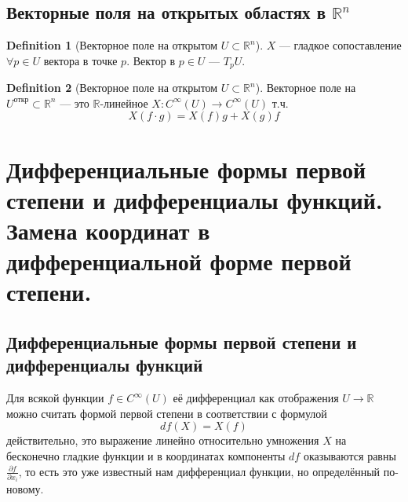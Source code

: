 \documentclass[a4paper,12pt]{article} %
\theoremstyle{definition}
\newtheorem{definition}{Definition}[section]
\begin{document}
\subsection{Векторные поля на открытых областях в $\mathbb{R}^n$}
\begin{definition}[Векторное поле на открытом $U \subset \mathbb{R}^n$]
	$X$ --- гладкое сопоставление $\forall p \in U$ вектора в точке $p$. Вектор в $p \in U$ --- $T_p U$.
\end{definition}
\begin{definition}[Векторное поле на открытом $U \subset \mathbb{R}^n$]
	Векторное поле на $U^{откр} \subset \mathbb{R}^n$ --- это $\mathbb{R}$-линейное $X: C^{\infty} (U) \rightarrow C^{\infty} (U)$ т.ч. 
	\begin{equation}
		X(f \cdot g) = X(f) g + X(g) f
	\end{equation}
\end{definition}
\section{Дифференциальные формы первой степени и дифференциалы функций. Замена координат в дифференциальной форме первой степени.}
\subsection{Дифференциальные формы первой степени и дифференциалы функций}
Для всякой функции $f \in C^{\infty}(U)$ её дифференциал как отображения $U \rightarrow \mathbb{R}$ можно считать формой первой степени в соответствии с формулой 
\begin{equation}
	df(X) = X(f)
\end{equation}
действительно, это выражение линейно относительно умножения $X$ на бесконечно гладкие функции и в координатах компоненты $df$ оказываются равны $\frac{\partial f}{\partial x_i}$, то есть это уже известный нам дифференциал функции, но определённый по-новому.
\end{document}
